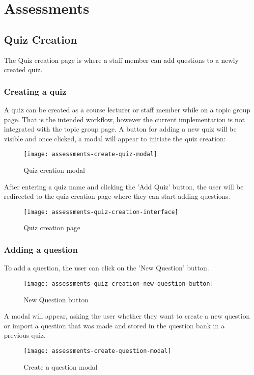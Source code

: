 \section{Assessments}

\subsection{Quiz Creation}
The Quiz creation page is where a staff member can add questions to a newly created quiz.

\subsubsection{Creating a quiz}
A quiz can be created as a course lecturer or staff member while on a topic group page. That is the intended workflow, however the current implementation is not integrated with the topic group page. A button for adding a new quiz will be visible and once clicked, a modal will appear to initiate the quiz creation:

\begin{figure}[h!]
	\centering
	\texttt{[image: assessments-create-quiz-modal]}
	\caption{Quiz creation modal}
\end{figure}

After entering a quiz name and clicking the 'Add Quiz' button, the user will be redirected to the quiz creation page where they can start adding questions.


\begin{figure}[h!]
	\centering
	\texttt{[image: assessments-quiz-creation-interface]}
	\caption{Quiz creation page}
\end{figure}


\subsubsection{Adding a question}
To add a question, the user can click on the 'New Question' button.

\begin{figure}[h!]
	\centering
	\texttt{[image: assessments-quiz-creation-new-question-button]}
	\caption{New Question button}
\end{figure}

A modal will appear, asking the user whether they want to create a new question or import a question that was made and stored in the question bank in a previous quiz. 

\begin{figure}[h!]
	\centering
	\texttt{[image: assessments-create-question-modal]}
	\caption{Create a question modal}
\end{figure}

